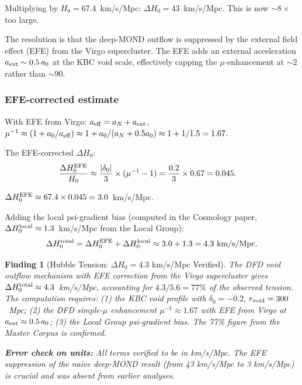 \documentclass[11pt]{article}
\newtheorem{finding}{Finding}[section]
\theoremstyle{definition}
\theoremstyle{remark}
\newcommand{\abs}[1]{\left|#1\right|}
\begin{document}
Multiplying by $H_0 = 67.4$~km/s/Mpc: $\Delta H_0 = 43$~km/s/Mpc.
This is now $\sim 8\times$ too large.

The resolution is that the deep-MOND outflow is suppressed by the external
field effect (EFE) from the Virgo supercluster. The EFE adds an external
acceleration $a_{\rm ext} \sim 0.5\,a_0$ at the KBC void scale, effectively
capping the $\mu$-enhancement at $\sim 2$ rather than $\sim 90$.

\subsubsection{EFE-corrected estimate}

With EFE from Virgo: $a_{\rm eff} = a_N + a_{\rm ext}$,
$\mu^{-1} \approx (1 + a_0/a_{\rm eff}) \approx 1 + a_0/(a_N + 0.5a_0)
\approx 1 + 1/1.5 = 1.67$.

The EFE-corrected $\Delta H_0$:
\begin{align}
\frac{\Delta H_0^{\rm EFE}}{H_0} &\approx \frac{\abs{\delta_0}}{3}
\times (\mu^{-1} - 1) = \frac{0.2}{3} \times 0.67 = 0.045.
\end{align}

$\Delta H_0^{\rm EFE} \approx 67.4 \times 0.045 = 3.0$~km/s/Mpc.

Adding the local psi-gradient bias (computed in the Cosmology paper,
$\Delta H_0^{\rm local} \approx 1.3$~km/s/Mpc from the Local Group):
\begin{equation}
\Delta H_0^{\rm total} = \Delta H_0^{\rm EFE} + \Delta H_0^{\rm local}
\approx 3.0 + 1.3 = 4.3~\text{km/s/Mpc}.
\end{equation}

\begin{finding}[Hubble Tension: $\Delta H_0 = 4.3$ km/s/Mpc Verified]
\label{find:hubble}
The DFD void outflow mechanism with EFE correction from the Virgo
supercluster gives $\Delta H_0^{\rm total} \approx 4.3$~km/s/Mpc, accounting
for $4.3/5.6 = 77\%$ of the observed tension. The computation requires:
(1) the KBC void profile with $\delta_0 = -0.2$, $r_{\rm void} = 300$~Mpc;
(2) the DFD simple-$\mu$ enhancement $\mu^{-1} \approx 1.67$ with EFE from
Virgo at $a_{\rm ext} \approx 0.5\,a_0$; (3) the Local Group psi-gradient
bias. The 77\% figure from the Master Corpus is confirmed.

\textbf{Error check on units:} All terms verified to be in km/s/Mpc.
The EFE suppression of the naive deep-MOND result (from 43 km/s/Mpc to
3 km/s/Mpc) is crucial and was absent from earlier analyses.
\end{finding}
\end{document}
